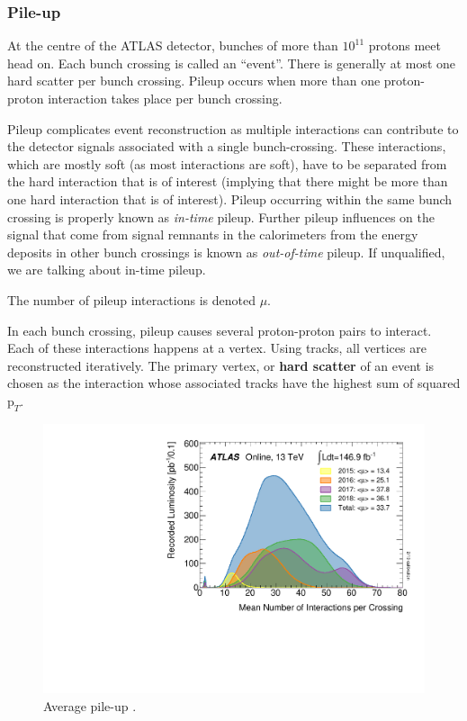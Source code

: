 \subsubsection{Pile-up}

At the centre of the ATLAS detector, bunches of more than $10^{11}$ protons meet head on.
Each bunch crossing is called an ``event''.
There is generally at most one hard scatter per bunch crossing.
Pileup occurs when more than one proton-proton interaction takes place per bunch crossing.

Pileup complicates event reconstruction as multiple interactions can contribute to the detector signals associated with a single bunch-crossing.
These interactions, which are mostly soft (as most interactions are soft), have to be separated from the hard interaction that is of interest (implying that there might be more than one hard interaction that is of interest).
Pileup occurring within the same bunch crossing is properly known as \textit{in-time} pileup.
Further pileup influences on the signal that come from signal remnants in the calorimeters from the energy deposits in other bunch crossings is known as \textit{out-of-time} pileup. If unqualified, we are talking about in-time pileup.

The number of pileup interactions is denoted $\mu$.

In each bunch crossing, pileup causes several proton-proton pairs to interact. Each of these interactions happens at a vertex. Using tracks, all vertices are reconstructed iteratively. The primary vertex, or \textbf{hard scatter} of an event is chosen as the interaction whose associated tracks have the highest sum of squared $\mathrm{p}_T$.
%
\begin{figure}[!htbp]
  \centering
  \includegraphics[width=0.6\linewidth]{chapters/2.detector/figs/mu_2015_2018.pdf}
  \caption{
    Average pile-up \cite{atlas-lumi-run2}.
  }
  \label{fig:run2_pileup}
\end{figure}
%



